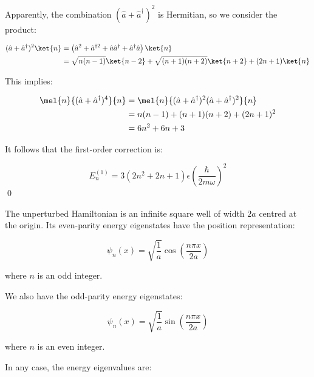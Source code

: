 \documentclass[12pt]{article}
\begin{document}
Apparently, the combination $(\hat{a} + \hat{a}^{\dagger})^{2}$ is Hermitian, so we consider the product:

\begin{equation}
    \begin{split}
        (\hat{a} + \hat{a}^{\dagger})^{2}\ket{n} &= \left( \hat{a}^{2} + \hat{a}^{\dagger 2} + \hat{a}\hat{a}^{\dagger} + \hat{a}^{\dagger}\hat{a} \right)\ket{n} \\
        &= \sqrt{n(n-1)} \ket{n-2} + \sqrt{(n+1)(n+2)} \ket{n+2} + (2n+1) \ket{n}
    \end{split}
\end{equation}

This implies:

\begin{equation}
    \begin{split}
        \mel{n}{(\hat{a} + \hat{a}^{\dagger})^{4}}{n} &= \mel{n}{(\hat{a} + \hat{a}^{\dagger})^{2}(\hat{a} + \hat{a}^{\dagger})^{2}}{n} \\
        &= n(n-1) + (n+1)(n+2) + (2n+1)^{2} \\
        &= 6n^{2} + 6n + 3
    \end{split}
\end{equation}

It follows that the first-order correction is:

\begin{equation}
    E_{n}^{(1)} = 3 (2n^{2} + 2n + 1) \epsilon \left( \frac{\hbar}{2m\omega} \right)^{2}
\end{equation}
\qed


The unperturbed Hamiltonian is an infinite square well of width $2a$ centred at the origin. Its even-parity energy eigenstates have the position representation:

\begin{equation}
    \psi_{n}(x) = \sqrt{\frac{1}{a}} \cos{\left( \frac{n\pi x}{2a} \right)}
\end{equation}

where $n$ is an odd integer.

We also have the odd-parity energy eigenstates:

\begin{equation}
    \psi_{n}(x) = \sqrt{\frac{1}{a}} \sin{\left( \frac{n\pi x}{2a} \right)}
\end{equation}

where $n$ is an even integer.

In any case, the energy eigenvalues are:
\end{document}

